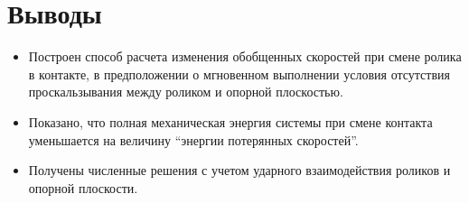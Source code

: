 
\section{Выводы}

\begin{itemize}
    \item Построен способ расчета изменения обобщенных скоростей при смене ролика в контакте, в предположении о мгновенном выполнении условия отсутствия проскальзывания между роликом и опорной плоскостью.
    \item Показано, что полная механическая энергия системы при смене контакта уменьшается на величину ``энергии потерянных скоростей''.
    \item Получены численные решения с учетом ударного взаимодействия роликов и опорной плоскости.
\end{itemize}